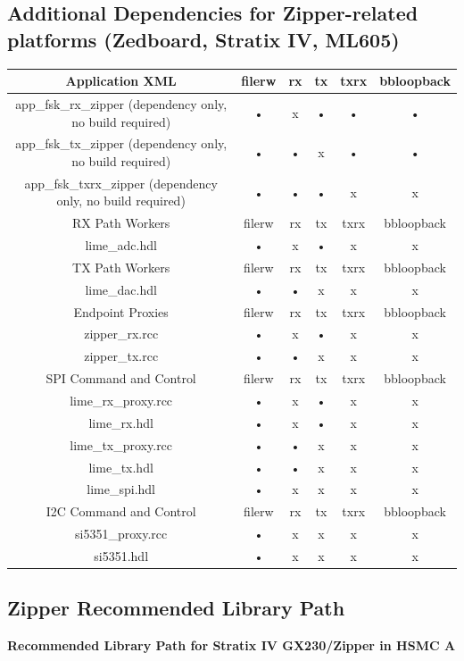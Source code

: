 \begin{appendices}
\subsection{Additional Dependencies for Zipper-related platforms (Zedboard, Stratix IV, ML605)}
	\begin{tabular}{|c|c|c|c|c|c|}
	\hline
	\rowcolor{blue}
	Application XML & filerw & rx & tx & txrx & bbloopback \\
	\hline
	app\_fsk\_rx\_zipper (dependency only, no build required) & • & x & • & • & • \\
	\hline
	app\_fsk\_tx\_zipper (dependency only, no build required) & • & • & x & • & • \\
	\hline
	app\_fsk\_txrx\_zipper (dependency only, no build required) & • & • & • & x & x \\
	\hline
	\rowcolor{blue}
	RX Path Workers & filerw & rx & tx & txrx & bbloopback \\
	\hline
	lime\_adc.hdl & • & x & • & x & x \\
	\hline
	\rowcolor{blue}
	TX Path Workers & filerw & rx & tx & txrx & bbloopback \\
	\hline
	lime\_dac.hdl & • & • & x & x & x \\
	\hline
	\rowcolor{blue}
	Endpoint Proxies & filerw & rx & tx & txrx & bbloopback \\
	\hline
	zipper\_rx.rcc & • & x & • & x & x \\
	\hline
	zipper\_tx.rcc & • & • & x & x & x \\
	\hline
	\rowcolor{blue}
	SPI Command and Control & filerw & rx & tx & txrx & bbloopback \\
	\hline
	lime\_rx\_proxy.rcc & • & x & • & x & x \\
	\hline
	lime\_rx.hdl & • & x & • & x & x \\
	\hline
	lime\_tx\_proxy.rcc & • & • & x & x & x \\
	\hline
	lime\_tx.hdl & • & • & x & x & x \\
	\hline
	lime\_spi.hdl & • & x & x & x & x \\
	\hline
	\rowcolor{blue}
	I2C Command and Control & filerw & rx & tx & txrx & bbloopback \\
	\hline
	si5351\_proxy.rcc & • & x & x & x & x \\
	\hline
	si5351.hdl & • & x & x & x & x \\
	\hline
	\end{tabular}
 
\medskip

\subsection{Zipper Recommended Library Path}
\noindent\textbf{Recommended Library Path for Stratix IV GX230/Zipper in HSMC A}\\


\end{appendices}
